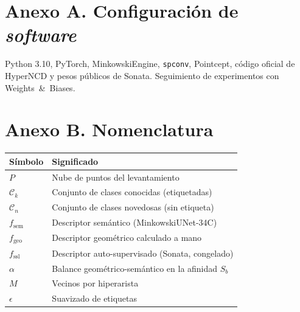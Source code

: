 \appendix
{}

\section*{Anexo A. Configuración de \emph{software}}

Python 3.10, PyTorch, MinkowskiEngine, \texttt{spconv}, Pointcept, código oficial
de HyperNCD y pesos públicos de Sonata. Seguimiento de experimentos con
Weights~\&~Biases.

\section*{Anexo B. Nomenclatura}

\begin{tabular}{@{}ll@{}}
\toprule
\textbf{Símbolo} & \textbf{Significado} \\
\midrule
$P$ & Nube de puntos del levantamiento \\
$\mathcal{C}_k$ & Conjunto de clases conocidas (etiquetadas) \\
$\mathcal{C}_n$ & Conjunto de clases novedosas (sin etiqueta) \\
$f_{\mathrm{sem}}$ & Descriptor semántico (MinkowskiUNet-34C) \\
$f_{\mathrm{geo}}$ & Descriptor geométrico calculado a mano \\
$f_{\mathrm{ssl}}$ & Descriptor auto-supervisado (Sonata, congelado) \\
$\alpha$ & Balance geométrico-semántico en la afinidad $S_b$ \\
$M$ & Vecinos por hiperarista \\
$\epsilon$ & Suavizado de etiquetas \\
\bottomrule
\end{tabular}
